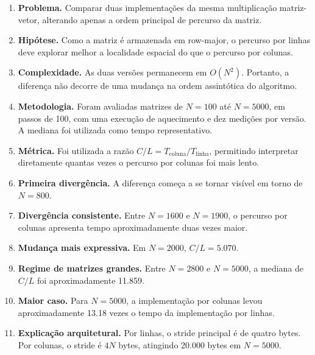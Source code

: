 \begin{enumerate}

    \item \textbf{Problema.}
    Comparar duas implementações da mesma multiplicação matriz-vetor,
    alterando apenas a ordem principal de percurso da matriz.

    \item \textbf{Hipótese.}
    Como a matriz é armazenada em row-major, o percurso por linhas deve
    explorar melhor a localidade espacial do que o percurso por colunas.

    \item \textbf{Complexidade.}
    As duas versões permanecem em \(O(N^2)\). Portanto, a diferença não
    decorre de uma mudança na ordem assintótica do algoritmo.

    \item \textbf{Metodologia.}
    Foram avaliadas matrizes de \(N=100\) até \(N=5000\), em passos de
    100, com uma execução de aquecimento e dez medições por versão. A
    mediana foi utilizada como tempo representativo.

    \item \textbf{Métrica.}
    Foi utilizada a razão
    \(C/L=T_{\mathrm{coluna}}/T_{\mathrm{linha}}\), permitindo interpretar
    diretamente quantas vezes o percurso por colunas foi mais lento.

    \item \textbf{Primeira divergência.}
    A diferença começa a se tornar visível em torno de \(N=800\).

    \item \textbf{Divergência consistente.}
    Entre \(N=1600\) e \(N=1900\), o percurso por colunas apresenta tempo
    aproximadamente duas vezes maior.

    \item \textbf{Mudança mais expressiva.}
    Em \(N=2000\), \(C/L=5.070\).

    \item \textbf{Regime de matrizes grandes.}
    Entre \(N=2800\) e \(N=5000\), a mediana de \(C/L\) foi aproximadamente
    11.859.

    \item \textbf{Maior caso.}
    Para \(N=5000\), a implementação por colunas levou aproximadamente
    13.18 vezes o tempo da implementação por linhas.

    \item \textbf{Explicação arquitetural.}
    Por linhas, o stride principal é de quatro bytes. Por colunas, o
    stride é \(4N\) bytes, atingindo 20.000 bytes em \(N=5000\).


\end{enumerate}
